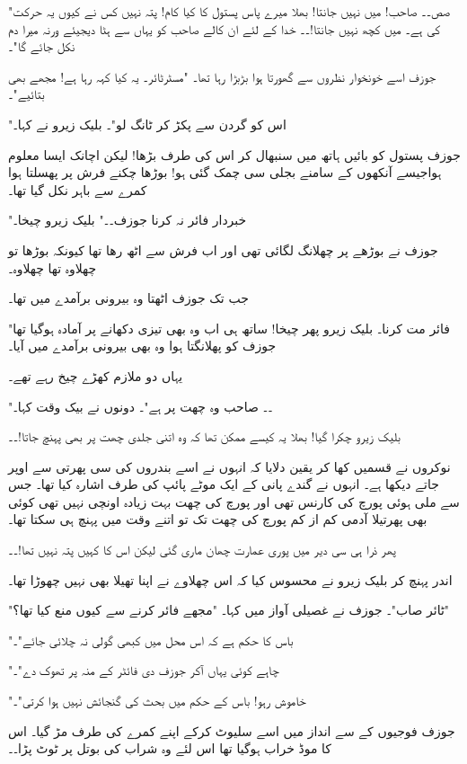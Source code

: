 "صص۔۔ صاحب! میں نہیں جانتا! بھلا میرے پاس پستول کا کیا کام! پتہ نہیں کس نے کیوں یہ حرکت کی ہے۔ میں کچھ نہیں جانتا!۔۔ خدا کے لئے ان کالے صاحب کو یہاں سے ہٹا دیجیئے ورنہ میرا دم نکل جائے گا"۔

جوزف اسے خونخوار نظروں سے گھورتا ہوا بڑبڑا رہا تھا۔ "مسٹرٹائر۔ یہ کیا کہہ رہا ہے! مجھے بھی بتائیے"۔

"اس کو گردن سے پکڑ کر ٹانگ لو"۔ بلیک زیرو نے کہا۔

جوزف پستول کو بائیں ہاتھ میں سنبھال کر اس کی طرف بڑھا! لیکن اچانک ایسا معلوم ہواجیسے آنکھوں کے سامنے بجلی سی چمک گئی ہو! بوڑھا چکنے فرش پر پھسلتا ہوا کمرے سے باہر نکل گیا تھا۔

"خبردار فائر نہ کرنا جوزف۔۔" بلیک زیرو چیخا۔

جوزف نے بوڑھے پر چھلانگ لگائی تھی اور اب فرش سے اٹھ رھا تھا کیونکہ بوڑھا تو چھلاوہ تھا چھلاوہ۔

جب تک جوزف اٹھتا وہ بیرونی برآمدے میں تھا۔

"فائر مت کرنا۔ بلیک زیرو پھر چیخا! ساتھ ہی اب وہ بھی تیزی دکھانے پر آمادہ ہوگیا تھا جوزف کو پھلانگتا ہوا وہ بھی بیرونی برآمدے میں آیا۔

یہاں دو ملازم کھڑے چیخ رہے تھے۔

"۔۔ صاحب وہ چھت پر ہے"۔ دونوں نے بیک وقت کہا۔

بلیک زیرو چکرا گیا! بھلا یہ کیسے ممکن تھا کہ وہ اتنی جلدی چھت پر بھی پہنچ جاتا!۔۔

نوکروں نے قسمیں کھا کر یقین دلایا کہ انہوں نے اسے بندروں کی سی پھرتی سے اوپر جاتے دیکھا ہے۔ انہوں نے گندے پانی کے ایک موٹے پائپ کی طرف اشارہ کیا تھا۔ جس سے ملی ہوئی پورچ کی کارنس تھی اور پورچ کی چھت بہت زیادہ اونچی نہیں تھی کوئی بھی پھرتیلا آدمی کم از کم پورچ کی چھت تک تو اتنے وقت میں پہنچ ہی سکتا تھا۔

پھر ذرا ہی سی دیر میں پوری عمارت چھان ماری گئی لیکن اس کا کہیں پتہ نہیں تھا!۔۔

اندر پہنچ کر بلیک زیرو نے محسوس کیا کہ اس چھلاوے نے اپنا تھیلا بھی نہیں چھوڑا تھا۔

"ٹائر صاب"۔ جوزف نے غصیلی آواز میں کہا۔ "مجھے فائر کرنے سے کیوں منع کیا تھا؟"

"باس کا حکم ہے کہ اس محل میں کبھی گولی نہ چلائی جائے"۔

"چاہے کوئی یہاں آکر جوزف دی فائٹر کے منہ پر تھوک دے"۔

"خاموش رہو! باس کے حکم میں بحث کی گنجائش نہیں ہوا کرتی"۔

جوزف فوجیوں کے سے انداز میں اسے سلیوٹ کرکے اپنے کمرے کی طرف مڑ گیا۔ اس کا موڈ خراب ہوگیا تھا اس لئے وہ شراب کی بوتل پر ٹوٹ پڑا۔۔

